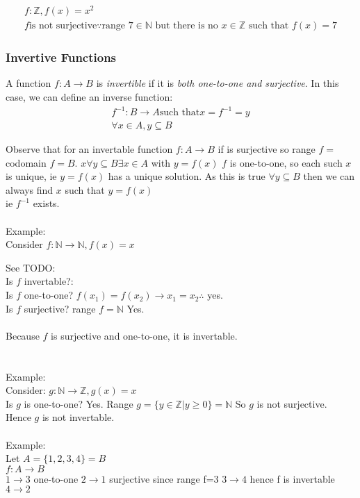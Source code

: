 \begin{align}
  f: \mathbb{Z}, f(x) = x^2 \\
  f \text{is not surjective} \because \text{range $7 \in \mathbb{N}$ but there is no $x \in \mathbb{Z}$ such that $f(x) = 7$}
\end{align}

\subsubsection{Invertive Functions}
A function $f: A \to B$ is \emph{invertible} if it is \emph{both one-to-one and
surjective}. In this case, we can define an inverse function:
\begin{align}
  f^{-1} : B \to A \text{such that} x = f^{-1} = y \\
  \forall x \in A, y \subseteq B
\end{align}


Observe that for an invertable function $f: A \to B$ if is surjective so range $f = $ codomain $f = B$.
$x \forall y \subseteq B \exists x \in A$ with $y = f(x)$
$f$ is one-to-one, so each such $x$ is unique, ie $y = f(x)$ has a unique solution. As this is
true $\forall y \subseteq B$ then we can always find $x$ such that $y = f(x)$ \\
ie $f^{-1}$ exists.\\
\\
Example:\\
Consider $f: \mathbb{N} \to \mathbb{N}, f(x) = x$

See TODO:
\\
Is $f$ invertable?: \\
Is $f$ one-to-one? $f(x_1) = f(x_2) \to x_1 = x_2 \therefore$ yes. \\
Is $f$ surjective? range $f = \mathbb{N}$ Yes. \\
\\
Because $f$ is surjective and one-to-one, it is invertable.\\
\\
\\
Example: \\
Consider: $g: \mathbb{N} \to \mathbb{Z}, g(x) = x$ \\
Is $g$ is one-to-one? Yes.
Range $g = \{y \in \mathbb{Z} | y \geq 0\} = \mathbb{N}$
So $g$ is not surjective. Hence $g$ is not invertable.
\\
\\
Example:\\
Let $A = \{1,2,3,4\} = B$ \\
$f: A \to B$ \\ 
$1 \to 3$ one-to-one
$2 \to 1$ surjective since range f=3
$3 \to 4$ hence f is invertable
$4 \to 2$

